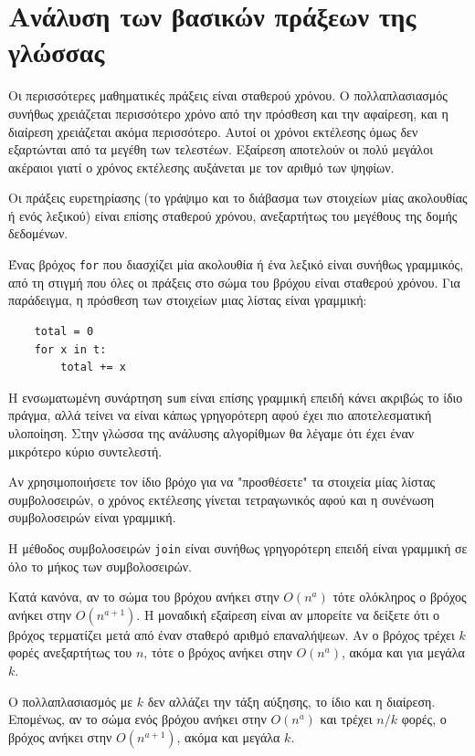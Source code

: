 \documentclass[10pt]{book}
\begin{document}
\section{Ανάλυση των βασικών πράξεων της γλώσσας}

Οι περισσότερες μαθηματικές πράξεις είναι σταθερού χρόνου.  Ο πολλαπλασιασμός 
συνήθως χρειάζεται περισσότερο χρόνο από την πρόσθεση και την αφαίρεση, και η διαίρεση χρειάζεται
ακόμα περισσότερο. Αυτοί οι χρόνοι εκτέλεσης όμως δεν εξαρτώνται από τα μεγέθη των τελεστέων.
Εξαίρεση αποτελούν οι πολύ μεγάλοι ακέραιοι γιατί ο χρόνος εκτέλεσης αυξάνεται με τον αριθμό
των ψηφίων.

Οι πράξεις ευρετηρίασης (το γράψιμο και το διάβασμα των στοιχείων μίας ακολουθίας ή
ενός λεξικού) είναι επίσης σταθερού χρόνου, ανεξαρτήτως του μεγέθους της δομής δεδομένων.

Ένας βρόχος {\tt for} που διασχίζει μία ακολουθία ή ένα λεξικό είναι συνήθως γραμμικός, από τη
στιγμή που όλες οι πράξεις στο σώμα του βρόχου είναι σταθερού χρόνου.  Για παράδειγμα, η πρόσθεση
των στοιχείων μιας λίστας είναι γραμμική:

\begin{verbatim}
    total = 0
    for x in t:
        total += x
\end{verbatim}

Η ενσωματωμένη συνάρτηση {\tt sum} είναι επίσης γραμμική επειδή κάνει ακριβώς το ίδιο πράγμα, αλλά
τείνει να είναι κάπως γρηγορότερη αφού έχει πιο αποτελεσματική υλοποίηση.  Στην γλώσσα της ανάλυσης
αλγορίθμων θα λέγαμε ότι έχει έναν μικρότερο κύριο συντελεστή.

Αν χρησιμοποιήσετε τον ίδιο βρόχο για να "προσθέσετε" τα στοιχεία μίας λίστας συμβολοσειρών, ο χρόνος
εκτέλεσης γίνεται τετραγωνικός αφού και η συνένωση συμβολοσειρών είναι γραμμική.

Η μέθοδος συμβολοσειρών {\tt join} είναι συνήθως γρηγορότερη επειδή είναι γραμμική σε όλο το μήκος των
συμβολοσειρών.

Κατά κανόνα, αν το σώμα του βρόχου ανήκει στην $O(n^a)$ τότε ολόκληρος ο βρόχος 
ανήκει στην $O(n^{a+1})$.  Η μοναδική εξαίρεση είναι αν μπορείτε να δείξετε ότι 
ο βρόχος τερματίζει μετά από έναν σταθερό αριθμό επαναλήψεων.  Αν ο βρόχος τρέχει 
$k$ φορές ανεξαρτήτως του $n$, τότε ο βρόχος ανήκει στην $O(n^a)$, ακόμα και για μεγάλα $k$.

Ο πολλαπλασιασμός με $k$ δεν αλλάζει την τάξη αύξησης, το ίδιο και η διαίρεση.  
Επομένως, αν το σώμα ενός βρόχου ανήκει στην $O(n^a)$ και τρέχει $n/k$ φορές, ο βρόχος ανήκει
στην $O(n^{a+1})$, ακόμα και μεγάλα $k$.
\end{document}
